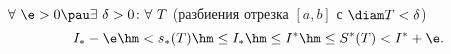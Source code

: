 
 	$\forall\ \e>0\pau\exists\ \delta>0\colon\forall\  T$ (разбиения отрезка $[a,b]$ с $\diam T<\delta$) 
 	\[I_*-\e\hm<s_*(T)\hm\leq I_*\hm\leq I^*\hm\leq S^*(T)<I^*+\e.\]
 
